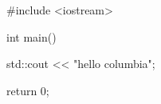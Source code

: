 \begin{console}
#include <iostream>

int main()
{
    std::cout << "hello columbia\n";

    return 0;
}
\end{console}

